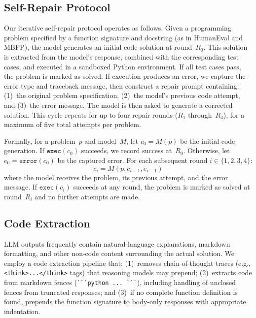\documentclass[conference]{IEEEtran}
\begin{document}
\subsection{Self-Repair Protocol}

Our iterative self-repair protocol operates as follows. Given a programming problem specified by a function signature and docstring (as in HumanEval and MBPP), the model generates an initial code solution at round~$R_0$. This solution is extracted from the model's response, combined with the corresponding test cases, and executed in a sandboxed Python environment. If all test cases pass, the problem is marked as solved. If execution produces an error, we capture the error type and traceback message, then construct a repair prompt containing: (1)~the original problem specification, (2)~the model's previous code attempt, and (3)~the error message. The model is then asked to generate a corrected solution. This cycle repeats for up to four repair rounds ($R_1$ through~$R_4$), for a maximum of five total attempts per problem.

Formally, for a problem~$p$ and model~$M$, let $c_0 = M(p)$ be the initial code generation. If $\texttt{exec}(c_0)$ succeeds, we record success at~$R_0$. Otherwise, let $e_0 = \texttt{error}(c_0)$ be the captured error. For each subsequent round $i \in \{1, 2, 3, 4\}$:
\begin{equation}
    c_i = M(p, c_{i-1}, e_{i-1})
\end{equation}
where the model receives the problem, its previous attempt, and the error message. If $\texttt{exec}(c_i)$ succeeds at any round, the problem is marked as solved at round~$R_i$ and no further attempts are made.

\subsection{Code Extraction}

LLM outputs frequently contain natural-language explanations, markdown formatting, and other non-code content surrounding the actual solution. We employ a code extraction pipeline that: (1)~removes chain-of-thought traces (e.g., \verb|<think>...</think>| tags) that reasoning models may prepend; (2)~extracts code from markdown fences (\verb|```python ... ```|), including handling of unclosed fences from truncated responses; and (3)~if no complete function definition is found, prepends the function signature to body-only responses with appropriate indentation.
\end{document}
